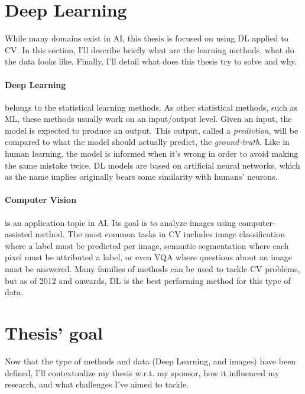 \section{Deep Learning}

While many domains exist in \acf{AI}, this thesis is focused on using \acf{DL} applied to \acf{CV}.
In this section, I'll describe briefly what are the learning methods, what do the data looks like.
Finally, I'll detail what does this thesis try to solve and why.

\paragraph{Deep Learning} belongs to the statistical learning methods. As other statistical methods,
such as \acf{ML}, these methods usually work on an input/output level. Given an input, the model is
expected to produce an output. This output, called a \textit{prediction}, will be compared to what
the model should actually predict, the \textit{ground-truth}. Like in human learning, the model is
informed when it's wrong in order to avoid making the same mistake twice. \acf{DL} models are based
on artificial neural networks, which as the name implies originally bears some similarity with
humans' neurons.

\paragraph{Computer Vision} is an application topic in \acf{AI}. Its goal is to analyze images using
computer-assisted method. The most common tasks in \acf{CV} includes image classification where a
label must be predicted per image, semantic segmentation where each pixel must be attributed a
label, or even \ac{VQA} where questions about an image must be answered. Many families of methods can
be used to tackle \ac{CV} problems, but as of 2012 and onwards, \acf{DL} is the best
performing method for this type of data.

\section{Thesis' goal}

Now that the type of methods and data (Deep Learning, and images) have been defined, I'll
contextualize my thesis w.r.t. my sponsor, how it influenced my research, and what challenges I've
aimed to tackle.

